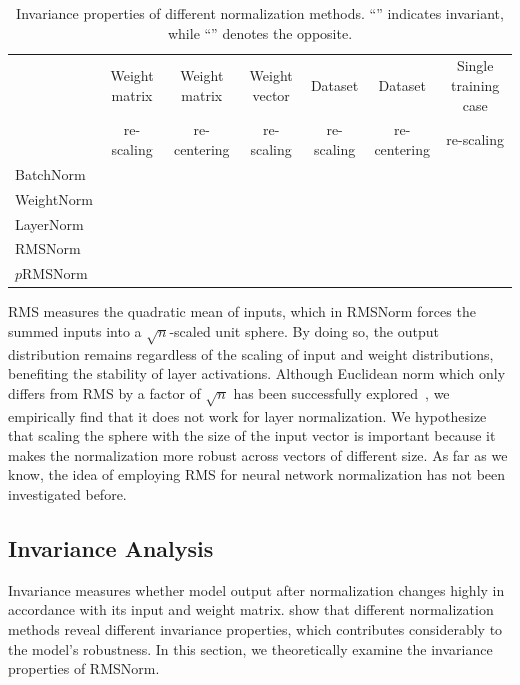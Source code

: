 \documentclass{article}
\newcommand{\cmark}{\ding{51}}
\newcommand{\xmark}{\ding{55}}
\begin{document}
\begin{table}[t]
\scriptsize
\centering
\begin{tabular}{l||c|c|c|c|c|c}

& {Weight matrix}& {Weight matrix} & {Weight vector}  & {Dataset} & {Dataset} & {Single training case}\\
& {re-scaling} & {re-centering} & {re-scaling} & {re-scaling} & {re-centering} & {re-scaling}\\
\hline
\hline
BatchNorm & \cmark & \xmark & \cmark & \cmark & \cmark & \xmark\\
WeightNorm & \cmark & \xmark & \cmark & \xmark & \xmark & \xmark\\
LayerNorm & \cmark & \cmark & \xmark & \cmark & \xmark & \cmark\\
\hline
\hline
RMSNorm & \cmark & \xmark & \xmark & \cmark & \xmark & \cmark \\
$p$RMSNorm & \cmark & \xmark & \xmark & \cmark & \xmark & \cmark \\
\end{tabular}
\caption{\label{tb_invariance} Invariance properties of different normalization methods. ``\cmark'' indicates invariant, while ``\xmark'' denotes the opposite.} 
\vspace{-0.22in}
\end{table}
RMS measures the quadratic mean of inputs, which in RMSNorm forces the summed inputs into a $\sqrt{n}$-scaled unit sphere. By doing so, the output distribution remains regardless of the scaling of input and weight distributions, benefiting the stability of layer activations. Although Euclidean norm which only differs from RMS by a factor of $\sqrt{n}$ has been successfully explored~\cite{NIPS2016_6114}, we empirically find that it does not work for layer normalization. We hypothesize that scaling the sphere with the size of the input vector is important because it makes the normalization more robust across vectors of different size. As far as we know, the idea of employing RMS for neural network normalization has not been investigated before.

\subsection{Invariance Analysis}

Invariance measures whether model output after normalization changes highly in accordance with its input and weight matrix. \citet{ba2016layer} show that different normalization methods reveal different invariance properties, which contributes considerably to the model's robustness. In this section, we theoretically examine the invariance properties of RMSNorm. 
\end{document}
